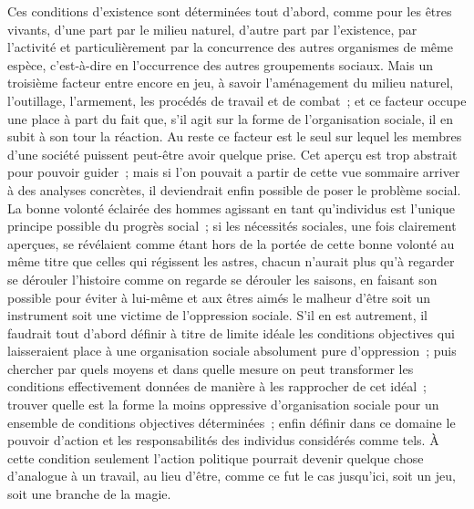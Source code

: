 \documentclass[french,twoside]{book} %
\begin{document}
Ces conditions d'existence sont déterminées tout d'abord, comme pour les êtres vivants, d'une part par le milieu naturel, d'autre part par l'existence, par l'activité et particulièrement par la concurrence des autres organismes de même espèce, c'est-à-dire en l'occurrence des autres groupements sociaux. Mais un troisième facteur entre encore en jeu, à savoir l'aménagement du milieu naturel, l'outillage, l'armement, les procédés de travail et de combat ; et ce facteur occupe une place à part du fait que, s'il agit sur la forme de l'organisation sociale, il en subit à son tour la réaction. Au reste ce facteur est le seul sur lequel les membres d'une société puissent peut-être avoir quelque prise. Cet aperçu est trop abstrait pour pouvoir guider ; mais si l'on pouvait a partir de cette vue sommaire arriver à des analyses concrètes, il deviendrait enfin possible de poser le problème social. La bonne volonté éclairée des hommes agissant en tant qu'individus est l'unique principe possible du progrès social ; si les nécessités sociales, une fois clairement aperçues, se révélaient comme étant hors de la portée de cette bonne volonté au même titre que celles qui régissent les astres, chacun n'aurait plus qu'à regarder se dérouler l'histoire comme on regarde se dérouler les saisons, en faisant son possible pour éviter à lui-même et aux êtres aimés le malheur d'être soit un instrument soit une victime de l'oppression sociale. S'il en est autrement, il faudrait tout d'abord définir à titre de limite idéale les conditions objectives qui laisseraient place à une organisation sociale absolument pure d'oppression ; puis chercher par quels moyens et dans quelle mesure on peut transformer les conditions effectivement données de manière à les rapprocher de cet idéal ; trouver quelle est la forme la moins oppressive d'organisation sociale pour un ensemble de conditions objectives déterminées ; enfin définir dans ce domaine le pouvoir d'action et les responsabilités des individus considérés comme tels. À cette condition seulement l'action politique pourrait devenir quelque chose d'analogue à un travail, au lieu d'être, comme ce fut le cas jusqu'ici, soit un jeu, soit une branche de la magie.\par
\end{document}
